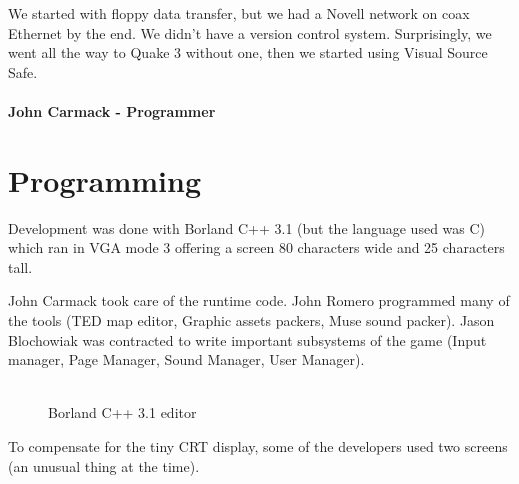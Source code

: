 \documentclass[book.tex]{subfiles}
\begin{document}
 \begin{fancyquotes}
We started with floppy data transfer, but we had a Novell network on coax Ethernet by the end. We didn't have a version control system.  Surprisingly, we went all the way to Quake 3 without one, then we started using Visual Source Safe.\\
 \\
\textbf{John Carmack - Programmer}
\end{fancyquotes}


























\section{Programming}



Development was done with Borland C++ 3.1 (but the language used was C) which ran in VGA mode 3 offering a screen 80 characters wide and 25 characters tall.\\
\par
John Carmack took care of the runtime code. John Romero programmed many of the tools (TED map editor, Graphic assets packers, Muse sound packer). Jason Blochowiak was contracted to write important subsystems of the game (Input manager, Page Manager, Sound Manager, User Manager).\\
\\
\begin{figure}[H]
\centering
\caption{Borland C++ 3.1 editor}
\end{figure}


To compensate for the tiny CRT display, some of the developers used two screens (an unusual thing at the time).\\
\end{document}
